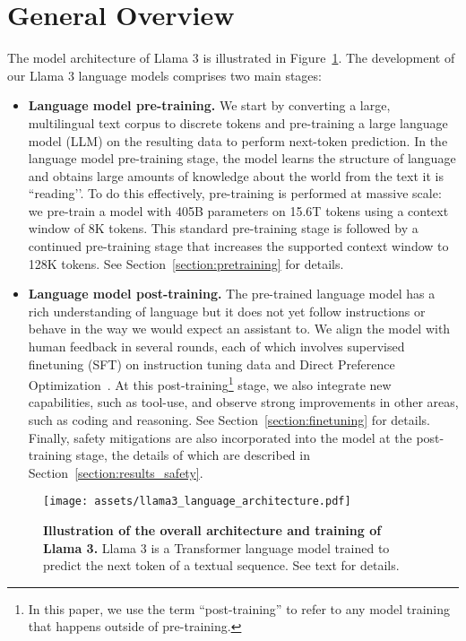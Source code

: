 \section{General Overview}
\label{section:overview}
The model architecture of Llama 3 is illustrated in Figure~\ref{sph:fig:language_model_overview}.
The development of our Llama 3 language models comprises two main stages:

\begin{itemize}

\item \textbf{Language model pre-training.} We start by converting a large, multilingual text corpus to discrete tokens and pre-training a large language model (LLM) on the resulting data to perform next-token prediction. In the language model pre-training stage, the model learns the structure of language and obtains large amounts of knowledge about the world from the text it is ``reading’’. To do this effectively, pre-training is performed at massive scale: we pre-train a model with 405B parameters on 15.6T tokens using a context window of 8K tokens. This standard pre-training stage is followed by a continued pre-training stage that increases the supported context window to 128K tokens. See Section~\ref{section:pretraining} for details.

\item \textbf{Language model post-training.} The pre-trained language model has a rich understanding of language but it does not yet follow instructions or behave in the way we would expect an assistant to. We align the model with human feedback in several rounds, each of which involves supervised finetuning (SFT) on instruction tuning data and Direct Preference Optimization~\citep[DPO;][]{rafailov2024direct}. At this post-training\footnote{In this paper, we use the term ``post-training'' to refer to any model training that happens outside of pre-training.} stage, we also integrate new capabilities, such as tool-use, and observe strong improvements in other areas, such as coding and reasoning. See Section~\ref{section:finetuning} for details. Finally, safety mitigations are also incorporated into the model at the post-training stage, the details of which are described in Section~\ref{section:results_safety}. 

\end{itemize}

\begin{figure}[t]
    \centering
    \texttt{[image: assets/llama3\_language\_architecture.pdf]}
    \caption{\textbf{Illustration of the overall architecture and training of Llama 3.} Llama 3 is a Transformer language model trained to predict the next token of a textual sequence. See text for details.}
    \label{sph:fig:language_model_overview}
\end{figure}

